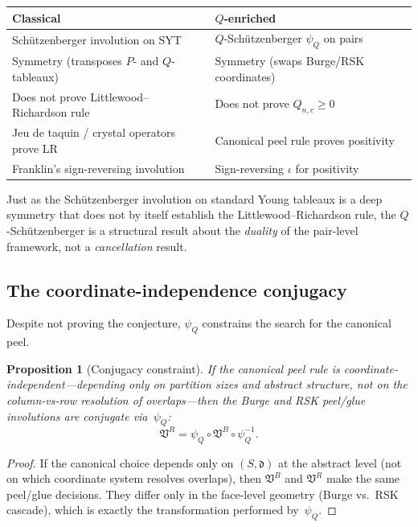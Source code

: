 \documentclass[11pt]{article}
\theoremstyle{plain}
\newtheorem{proposition}[theorem]{Proposition}
\theoremstyle{definition}
\begin{document}
\begin{center}
\begin{tabular}{l|l}
\textbf{Classical} & \textbf{$Q$-enriched} \\ \hline
Sch\"utzenberger involution on SYT &
  $Q$-Sch\"utzenberger $\psi_Q$ on pairs \\[3pt]
Symmetry (transposes $P$- and $Q$-tableaux) &
  Symmetry (swaps Burge/RSK coordinates) \\[3pt]
Does not prove Littlewood--Richardson rule &
  Does not prove $Q_{n,c} \geq 0$ \\[3pt]
Jeu de taquin / crystal operators prove LR &
  Canonical peel rule proves positivity \\[3pt]
Franklin's sign-reversing involution &
  Sign-reversing $\iota$ for positivity
\end{tabular}
\end{center}

Just as the Sch\"utzenberger involution on standard Young
tableaux is a deep symmetry that does not by itself establish
the Littlewood--Richardson rule, the $Q$-Sch\"utzenberger is a
structural result about the \emph{duality} of the pair-level
framework, not a \emph{cancellation} result.


\subsection{The coordinate-independence conjugacy}

Despite not proving the conjecture, $\psi_Q$ constrains the
search for the canonical peel.

\begin{proposition}[Conjugacy constraint]
\label{prop:conjugacy}
If the canonical peel rule is \emph{coordinate-independent}---depending
only on partition sizes and abstract structure, not on the
column-vs-row resolution of overlaps---then the Burge and RSK
peel/glue involutions are conjugate via~$\psi_Q$:
\begin{equation}\label{eq:conjugacy}
  \mathfrak{V}^R = \psi_Q \circ \mathfrak{V}^B \circ \psi_Q^{-1}.
\end{equation}
\end{proposition}

\begin{proof}
If the canonical choice depends only on $(S, \mathfrak{d})$ at
the abstract level (not on which coordinate system resolves
overlaps), then $\mathfrak{V}^B$ and $\mathfrak{V}^R$ make the
same peel/glue decisions.  They differ only in the face-level
geometry (Burge vs.\ RSK cascade), which is exactly the
transformation performed by~$\psi_Q$.
\end{proof}
\end{document}
